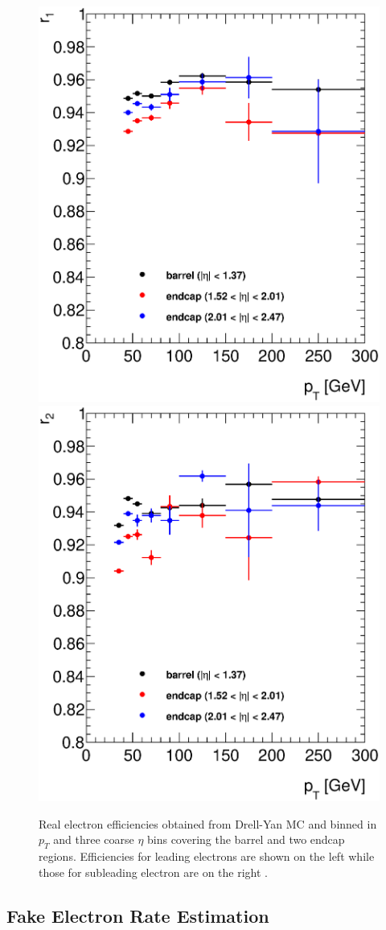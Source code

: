    \begin{figure}[h]
      \begin{center}
      \includegraphics[width=0.48\linewidth]{images/r1.eps}
      \includegraphics[width=0.48\linewidth]{images/r2.eps}
      \end{center}
   \caption{Real electron efficiencies obtained from Drell-Yan MC and binned in $p_{T}$ and three coarse $\eta$ bins covering the barrel and two endcap regions. Efficiencies for leading electrons are shown on the left while those for subleading electron are on the right \cite{Z':1564935}.}
   \label{fig:realEff}
   \end{figure}



\subsection{Fake Electron Rate Estimation}

